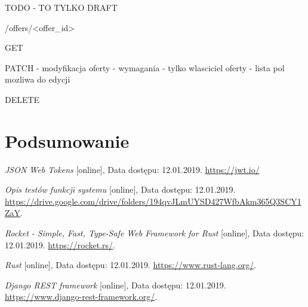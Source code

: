 \documentclass[12pt, notitlepage]{article}
\begin{document}
TODO - TO TYLKO DRAFT

/offers/<offer\_id>

GET

PATCH - modyfikacja oferty
- wymagania - tylko wlasciciel oferty
- lista pol mozliwa do edycji

DELETE


\section{Podsumowanie}

\begin{thebibliography}{9}

\textit{JSON Web Tokens} [online], Data dostępu: 12.01.2019. 
\newline\url{https://jwt.io/}

\textit{Opis testów funkcji systemu} [online], Data dostępu: 12.01.2019. 
\newline\url{https://drive.google.com/drive/folders/194qvJLmUYSD427WfbAkm365Q3SCY1ZaY}.

\textit{Rocket - Simple, Fast, Type-Safe Web Framework for Rust} [online], Data dostępu: 12.01.2019. 
\newline\url{https://rocket.rs/}.

\textit{Rust} [online], Data dostępu: 12.01.2019. 
\newline\url{https://www.rust-lang.org/}.

\textit{Django REST framework} [online], Data dostępu: 12.01.2019. 
\newline\url{https://www.django-rest-framework.org/}.

\end{thebibliography} 
\end{document}
